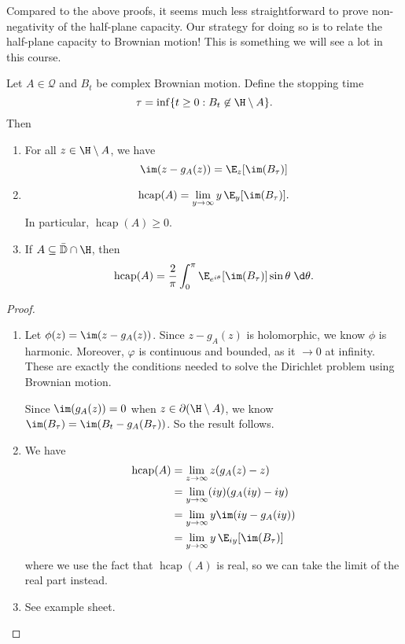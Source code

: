 \documentclass[a4paper]{article}
\renewcommand\D{\mathbb{D}}
\DeclareMathOperator\hcap{hcap}
\begin{document}
Compared to the above proofs, it seems much less straightforward to prove non-negativity of the half-plane capacity. Our strategy for doing so is to relate the half-plane capacity to Brownian motion! This is something we will see a lot in this course.

\begin{prop}
  Let $A \in \mathcal{Q}$ and $B_t$ be complex Brownian motion. Define the stopping time
  \[
    \tau = \inf\{t \geq 0: B_t \not \in \H \setminus A\}.
  \]
  Then
  \begin{enumerate}
    \item For all $z \in \H \setminus A$, we have
      \[
        \im(z - g_A(z)) = \E_z[\im(B_\tau)]
      \]
    \item
      \[
        \hcap(A) = \lim_{y \to \infty} y\, \E_y[\im(B_\tau)].
      \]
      In particular, $\hcap(A) \geq 0$.
    \item If $A \subseteq \bar{\D} \cap \H$, then
      \[
        \hcap(A) = \frac{2}{\pi} \int_0^\pi \E_{e^{i\theta}}[\im(B_\tau)]\sin \theta \;\d \theta.
      \]
  \end{enumerate}
\end{prop}

\begin{proof}\leavevmode
  \begin{enumerate}
    \item Let $\phi(z) = \im(z - g_A(z))$. Since $z - g_A(z)$ is holomorphic, we know $\phi$ is harmonic. Moreover, $\varphi$ is continuous and bounded, as it $\to 0$ at infinity. These are exactly the conditions needed to solve the Dirichlet problem using Brownian motion.

      Since $\im (g_A(z)) = 0$ when $z \in \partial (\H \setminus A)$, we know $\im(B_\tau) = \im(B_t - g_A(B_\tau))$. So the result follows.

    \item We have
      \begin{align*}
        \hcap(A) &= \lim_{z \to \infty} z (g_A(z) - z) \\
        &= \lim_{y \to \infty} (iy) (g_A(iy) - iy)\\
        &= \lim_{y \to \infty} y \im (iy - g_A(iy))\\
        &= \lim_{y \to \infty} y\, \E_{iy} [\im(B_\tau)]
      \end{align*}
      where we use the fact that $\hcap(A)$ is real, so we can take the limit of the real part instead.
    \item See example sheet.\qedhere
  \end{enumerate}
\end{proof}
\end{document}
